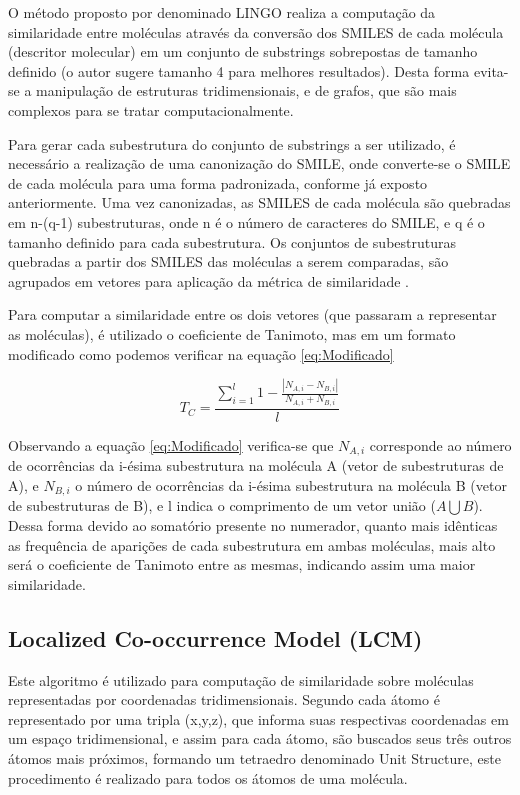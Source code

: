 O método proposto por \cite{vidal2005lingo} denominado LINGO realiza a computação da similaridade entre moléculas através da conversão dos SMILES de cada molécula (descritor molecular) em um conjunto de substrings sobrepostas de tamanho definido (o autor sugere tamanho 4 para melhores resultados). Desta forma evita-se a manipulação de estruturas tridimensionais, e de grafos, que são mais complexos para se tratar computacionalmente.

Para gerar cada subestrutura do conjunto de substrings a ser utilizado, é necessário a
realização de uma canonização do SMILE, onde converte-se o SMILE de cada molécula para 
uma forma padronizada, conforme já exposto anteriormente. Uma vez canonizadas, as 
SMILES de cada molécula são quebradas em n-(q-1) subestruturas, onde n é o número de 
caracteres do SMILE, e q é o tamanho definido para cada subestrutura. Os conjuntos de 
subestruturas quebradas a partir dos SMILES das moléculas a serem comparadas, são 
agrupados em vetores para aplicação da métrica de similaridade \cite{vidal2005lingo}.

Para computar a similaridade entre os dois vetores (que passaram a representar as 
moléculas), é utilizado o coeficiente de Tanimoto, mas em um formato modificado como podemos verificar na equação \eqref{eq:Modificado}

\begin{equation}
T_{C} =\frac{\sum\limits_{i=1}^{l}1-\frac{|N_{A,i}-N_{B,i}|}{N_{A,i}+N_{B,i}}}{l}
\label{eq:Modificado}
\end{equation}

Observando a equação \eqref{eq:Modificado} verifica-se que $N_{A,i}$ corresponde ao número de ocorrências da i-ésima subestrutura na molécula A (vetor de subestruturas de A), e $N_{B,i}$ o número de 
ocorrências da i-ésima subestrutura na molécula B (vetor de subestruturas de B), e l indica o 
comprimento de um vetor união ($A\bigcup B$). Dessa forma devido ao somatório presente no 
numerador, quanto mais idênticas as frequência de aparições de cada subestrutura em ambas 
moléculas, mais alto será o coeficiente de Tanimoto entre as mesmas, indicando assim uma 
maior similaridade.

\subsection{Localized Co-occurrence Model (LCM)}
Este algoritmo é utilizado para computação de similaridade sobre moléculas
representadas por coordenadas tridimensionais. Segundo \cite{huang2008localized} cada átomo é representado por uma tripla (x,y,z), que informa suas respectivas coordenadas em um espaço tridimensional, e assim para cada átomo, são buscados seus três outros átomos mais próximos, formando um tetraedro denominado Unit Structure, este procedimento é realizado para todos os átomos de uma molécula.

